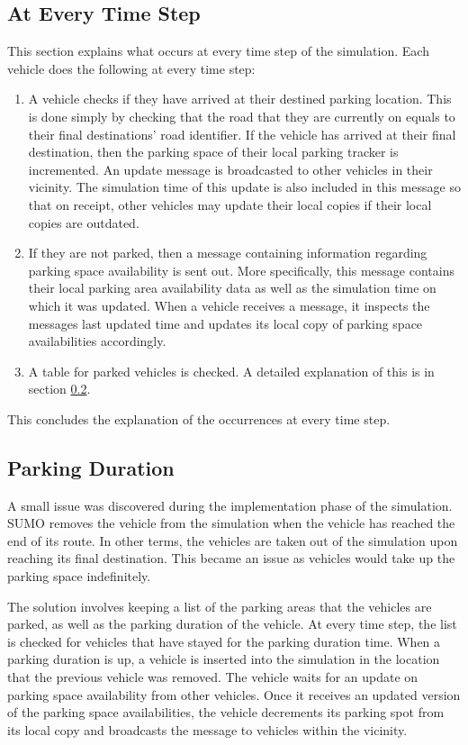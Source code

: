 \subsection{At Every Time Step} \label{ssec:time_step}
This section explains what occurs at every time step of the simulation. Each vehicle does the following at every time step:
\begin{enumerate}
    \item A vehicle checks if they have arrived at their destined parking location. This is done simply by checking that the road that they are currently on equals to their final destinations' road identifier. If the vehicle has arrived at their final destination, then the parking space of their local parking tracker is incremented. An update message is broadcasted to other vehicles in their vicinity. The simulation time of this update is also included in this message so that on receipt, other vehicles may update their local copies if their local copies are outdated.
    \item If they are not parked, then a message containing information regarding parking space availability is sent out. More specifically, this message contains their local parking area availability data as well as the simulation time on which it was updated. When a vehicle receives a message, it inspects the messages last updated time and updates its local copy of parking space availabilities accordingly.
    \item A table for parked vehicles is checked. A detailed explanation of this is in section \ref{ssec:parking}.
\end{enumerate}

This concludes the explanation of the occurrences at every time step.

\subsection{Parking Duration} \label{ssec:parking}
A small issue was discovered during the implementation phase of the simulation. SUMO removes the vehicle from the simulation when the vehicle has reached the end of its route. In other terms, the vehicles are taken out of the simulation upon reaching its final destination. This became an issue as vehicles would take up the parking space indefinitely.

The solution involves keeping a list of the parking areas that the vehicles are parked, as well as the parking duration of the vehicle. At every time step, the list is checked for vehicles that have stayed for the parking duration time. When a parking duration is up, a vehicle is inserted into the simulation in the location that the previous vehicle was removed. The vehicle waits for an update on parking space availability from other vehicles. Once it receives an updated version of the parking space availabilities, the vehicle decrements its parking spot from its local copy and broadcasts the message to vehicles within the vicinity.


